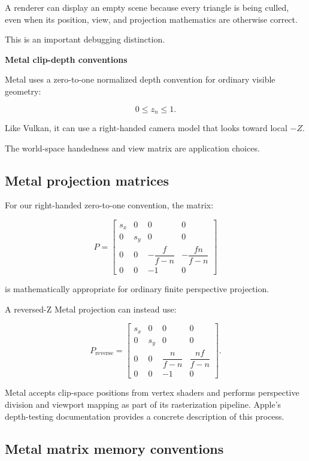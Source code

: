 A renderer can display an empty scene because every triangle is being culled, even when its position, view, and projection mathematics are otherwise correct.

This is an important debugging distinction.

\textbf{Metal clip-depth conventions}

Metal uses a zero-to-one normalized depth convention for ordinary visible geometry:

\[
 \boxed{ 0\le z_n\le1 }.
\]

Like Vulkan, it can use a right-handed camera model that looks toward local \(-Z\).

The world-space handedness and view matrix are application choices.

\subsection{Metal projection matrices}\label{02-foundations-ii-ch033-metal-projection-matrices}

For our right-handed zero-to-one convention, the matrix:

\[
 P= \begin{bmatrix} s_x&0&0&0\\ 0&s_y&0&0\\ 0&0&-\dfrac f{f-n}&-\dfrac{fn}{f-n}\\ 0&0&-1&0 \end{bmatrix}
\]

is mathematically appropriate for ordinary finite perspective projection.

A reversed-Z Metal projection can instead use:

\[
 P_{\mathrm{reverse}}= \begin{bmatrix} s_x&0&0&0\\ 0&s_y&0&0\\ 0&0&\dfrac n{f-n}&\dfrac{nf}{f-n}\\ 0&0&-1&0 \end{bmatrix}.
\]

Metal accepts clip-space positions from vertex shaders and performs perspective division and viewport mapping as part of its rasterization pipeline. Apple's depth-testing documentation provides a concrete description of this process. 

\subsection{Metal matrix memory conventions}\label{02-foundations-ii-ch033-metal-matrix-memory-conventions}


